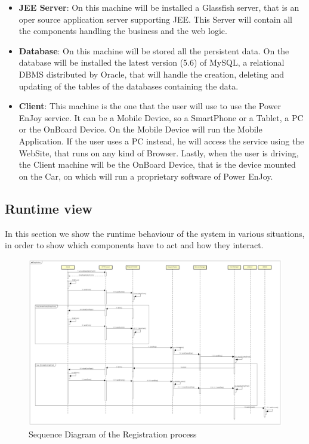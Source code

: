 \begin{itemize}
\item \textbf{JEE Server}: On this machine will be installed a Glassfish server, that is an oper source application server supporting JEE. This Server will contain all the components handling the business and the web logic.
\item \textbf{Database}: On this machine will be stored all the persistent data. On the database will be installed the latest version (5.6) of MySQL, a relational DBMS distributed by Oracle, that will handle the creation, deleting and updating of the tables of the databases containing the data.
\item \textbf{Client}: This machine is the one that the user will use to use the Power EnJoy service. It can be a Mobile Device, so a SmartPhone or a Tablet, a PC or the OnBoard Device. On the Mobile Device will run the Mobile Application. If the user uses a PC instead, he will access the service using the WebSite, that runs on any kind of Browser. Lastly, when the user is driving, the Client machine will be the OnBoard Device, that is the device mounted on the Car, on which will run a proprietary software of Power EnJoy.
\end{itemize}

\newpage

\subsection{Runtime view}
In this section we show the runtime behaviour of the system in various situations, in order to show which components have to act and how they interact.
\begin{figure}[H]	
	\centering
	\includegraphics[width=\textwidth]{img/sequence_registration}
	\caption{Sequence Diagram of the Registration process}
\end{figure}
\newpage

